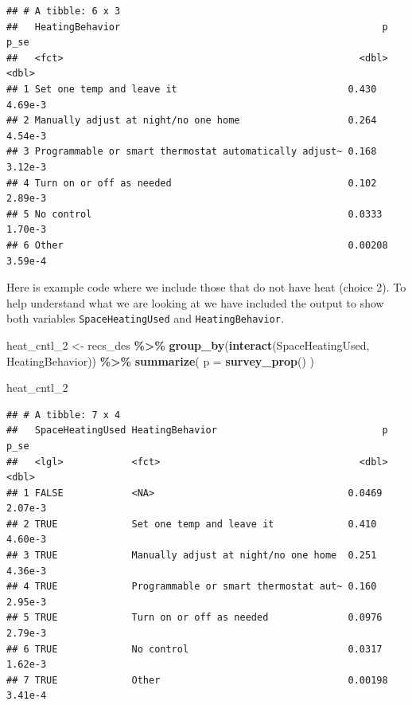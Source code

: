 \documentclass[
]{krantz}
\makeatletter
\newenvironment{Shaded}{\begin{snugshade}}{\end{snugshade}}
\newcommand{\AttributeTok}[1]{\textcolor[rgb]{0.27,0.27,0.27}{#1}}
\newcommand{\FunctionTok}[1]{\textcolor[rgb]{0.27,0.27,0.27}{\textbf{#1}}}
\newcommand{\NormalTok}[1]{#1}
\newcommand{\OtherTok}[1]{\textcolor[rgb]{0.37,0.37,0.37}{#1}}
\newcommand{\SpecialCharTok}[1]{\textcolor[rgb]{0.43,0.43,0.43}{\textbf{#1}}}
\newenvironment{kframe}{%
\medskip{}
\setlength{\fboxsep}{.8em}
 \def\at@end@of@kframe{}%
 \ifinner\ifhmode%
  \def\at@end@of@kframe{\end{minipage}}%
  \begin{minipage}{\columnwidth}%
 \fi\fi%
 \def\FrameCommand##1{\hskip\@totalleftmargin \hskip-\fboxsep
 \colorbox{shadecolor}{##1}\hskip-\fboxsep
     \hskip-\linewidth \hskip-\@totalleftmargin \hskip\columnwidth}%
 \MakeFramed {\advance\hsize-\width
   \@totalleftmargin\z@ \linewidth\hsize
   \@setminipage}}%
 {\par\unskip\endMakeFramed%
 \at@end@of@kframe}
\renewenvironment{Shaded}{\begin{kframe}}{\end{kframe}}
\makeatother
\begin{document}
\begin{verbatim}
## # A tibble: 6 x 3
##   HeatingBehavior                                              p    p_se
##   <fct>                                                    <dbl>   <dbl>
## 1 Set one temp and leave it                              0.430   4.69e-3
## 2 Manually adjust at night/no one home                   0.264   4.54e-3
## 3 Programmable or smart thermostat automatically adjust~ 0.168   3.12e-3
## 4 Turn on or off as needed                               0.102   2.89e-3
## 5 No control                                             0.0333  1.70e-3
## 6 Other                                                  0.00208 3.59e-4
\end{verbatim}

Here is example code where we include those that do not have heat (choice 2). To help understand what we are looking at we have included the output to show both variables \texttt{SpaceHeatingUsed} and \texttt{HeatingBehavior}.

\begin{Shaded}
\begin{Highlighting}[]
\NormalTok{heat\_cntl\_2 }\OtherTok{\textless{}{-}}\NormalTok{ recs\_des }\SpecialCharTok{\%\textgreater{}\%}
  \FunctionTok{group\_by}\NormalTok{(}\FunctionTok{interact}\NormalTok{(SpaceHeatingUsed, HeatingBehavior)) }\SpecialCharTok{\%\textgreater{}\%}
  \FunctionTok{summarize}\NormalTok{(}
    \AttributeTok{p =} \FunctionTok{survey\_prop}\NormalTok{()}
\NormalTok{  )}

\NormalTok{heat\_cntl\_2}
\end{Highlighting}
\end{Shaded}

\begin{verbatim}
## # A tibble: 7 x 4
##   SpaceHeatingUsed HeatingBehavior                             p    p_se
##   <lgl>            <fct>                                   <dbl>   <dbl>
## 1 FALSE            <NA>                                  0.0469  2.07e-3
## 2 TRUE             Set one temp and leave it             0.410   4.60e-3
## 3 TRUE             Manually adjust at night/no one home  0.251   4.36e-3
## 4 TRUE             Programmable or smart thermostat aut~ 0.160   2.95e-3
## 5 TRUE             Turn on or off as needed              0.0976  2.79e-3
## 6 TRUE             No control                            0.0317  1.62e-3
## 7 TRUE             Other                                 0.00198 3.41e-4
\end{verbatim}
\end{document}
